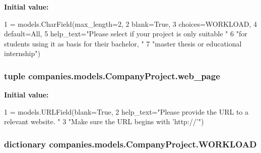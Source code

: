 {\bfseries Initial value\-:}
\begin{DoxyCode}
1 = models.CharField(max\_length=2,
2                                                      blank=\textcolor{keyword}{True},
3                                                      choices=WORKLOAD,
4                                                      default=All,
5                                                      help\_text=\textcolor{stringliteral}{"Please select if your project is only
       suitable "}
6                                                                \textcolor{stringliteral}{"for students using it as basis for their
       bachelor, "}
7                                                                \textcolor{stringliteral}{"master thesis or educational internship"})
\end{DoxyCode}
\hypertarget{classcompanies_1_1models_1_1_company_project_a586c880356becb5915074982a3fb6ccc}{
\subsubsection[{web\-\_\-page}]{\setlength{\rightskip}{0pt plus 5cm}tuple companies.\-models.\-Company\-Project.\-web\-\_\-page\hspace{0.3cm}{\ttfamily [static]}}}\label{classcompanies_1_1models_1_1_company_project_a586c880356becb5915074982a3fb6ccc}
{\bfseries Initial value\-:}
\begin{DoxyCode}
1 = models.URLField(blank=\textcolor{keyword}{True},
2                                help\_text=\textcolor{stringliteral}{"Please provide the URL to a relevant website. "}
3                                          \textcolor{stringliteral}{"Make sure the URL begins with 'http://'"})
\end{DoxyCode}
\hypertarget{classcompanies_1_1models_1_1_company_project_a12c29622767ae59fca574ba75309d191}{
\subsubsection[{W\-O\-R\-K\-L\-O\-A\-D}]{\setlength{\rightskip}{0pt plus 5cm}dictionary companies.\-models.\-Company\-Project.\-W\-O\-R\-K\-L\-O\-A\-D\hspace{0.3cm}{\ttfamily [static]}}}\label{classcompanies_1_1models_1_1_company_project_a12c29622767ae59fca574ba75309d191}
